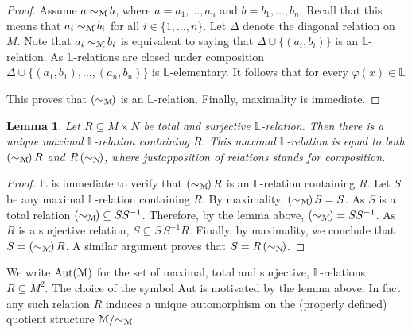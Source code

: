 \documentclass[12pt,letterpaper,oneside,reqno]{amsart}
\theoremstyle{plain}
\newtheorem{lemma}[theorem]{Lemma}
\theoremstyle{remark}
\begin{document}
\begin{proof}
  Assume $a\sim_{\EuScript M\!}b$, where $a=a_1,\dots,a_n$ and $b=b_1,\dots,b_n$.
  Recall that this means that $a_i\sim_{\EuScript M\!}b_i$ for all $i\in\{1,\dots,n\}$.
  Let $\Delta$ denote the diagonal relation on $ M$.
  Note that $a_i\sim_{\EuScript M\!}b_i$ is equivalent to saying that $\Delta\cup\{(a_i,b_i)\}$ is an $\mathds{L}$-relation.
  As $\mathds{L}$-relations are closed under composition $\Delta\cup\big\{(a_1,b_1),\dots,(a_n,b_n)\big\}$ is $\mathds{L}$-elementary.
  It follows that for every $\varphi(x)\in\mathds{L}$

  
  This proves that $(\sim_{\EuScript M\!})$ is an $\mathds{L}$-relation.
  Finally, maximality is immediate.
\end{proof}


\begin{lemma}
  Let $R\subseteq  M\times N$ be total and surjective $\mathds{L}$-relation.
  Then there is a unique maximal $\mathds{L}$-relation containing $R$.
  This maximal $\mathds{L}$-relation is equal to both $(\sim_{\EuScript M\!})\,R$ and $R\,(\sim_{\EuScript N\!})$, where justapposition of relations stands for composition.
\end{lemma}
\begin{proof}
  It is immediate to verify that $(\sim_{\EuScript M\!})\,R$ is an $\mathds{L}$-relation containing $R$.
  Let $S$ be any maximal $\mathds{L}$-relation containing $R$.
  By maximality, $(\sim_{\EuScript M\!})\,S=S$.
  As $S$ is a total relation $(\sim_{\EuScript M\!})\subseteq SS^{-1}$.
  Therefore, by the lemma above, $(\sim_{\EuScript M\!})=SS^{-1}$.
  As $R$ is a surjective relation, $S\subseteq S\,S^{-1}R$.
  Finally, by maximality, we conclude that $S=(\sim_{\EuScript M\!})\,R$.
  A similar argument proves that $S=R\,(\sim_{\EuScript N\!})$.
\end{proof}

We write ${\rm Aut}({\EuScript M})$ for the set of maximal, total and surjective, $\mathds{L}$-relations $R\subseteq  M^2$.
The choice of the symbol Aut is motivated by the lemma above.
In fact any such relation $R$ induces a unique automorphism on the (properly defined) quotient structure ${\EuScript M}/{\sim_{\EuScript M\!}}$.
\end{document}
